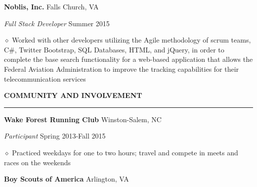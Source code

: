 \documentclass[executivepaper]{extarticle}
\begin{document}
\begin{center}
{\begin{minipage}{7.0in}
{\noindent \textbf{\fontsize{12}{8}\selectfont Noblis, Inc.}} {\hfill \fontsize{10}{8}\selectfont Falls Church, VA}

\vspace{0.25mm}

{\noindent \textit{\fontsize{12}{8}\selectfont Full Stack Developer}} {\hfill \fontsize{10}{8}\selectfont Summer 2015}

\vspace{0.25mm}

{\noindent $\diamond$ {\fontsize{12}{8}\selectfont Worked with other developers utilizing the Agile methodology of scrum teams, C\#, Twitter Bootstrap, SQL Databases, HTML, and jQuery, in order to complete
the base search functionality for a web-based application that allows the Federal Aviation Administration to improve the tracking capabilities for their telecommunication services}}

\vspace{3mm}


{\noindent \textbf{\fontsize{12}{9}\selectfont COMMUNITY AND INVOLVEMENT}}

\vspace{-3mm}

\noindent \rule{\textwidth}{0.5pt}

\vspace{0.5mm}

{\noindent \textbf{\fontsize{12}{8}\selectfont Wake Forest Running Club}} {\hfill \fontsize{10}{8}\selectfont Winston-Salem, NC}

\vspace{0.25mm}

{\noindent \textit{\fontsize{12}{8}\selectfont Participant}} {\hfill \fontsize{10}{8}\selectfont Spring 2013-Fall 2015}

\vspace{0.25mm}

{\noindent $\diamond$ {\fontsize{12}{8}\selectfont Practiced weekdays for one to two hours; travel and compete in meets and races on the weekends}}

\vspace{2mm}

{\noindent \textbf{\fontsize{12}{8}\selectfont Boy Scouts of America}} {\hfill \fontsize{10}{8}\selectfont Arlington, VA}

\vspace{0.25mm}


\end{minipage}}
\end{center}
\end{document}
